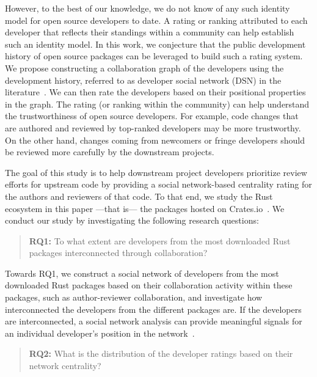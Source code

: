 \documentclass[10pt,journal,compsoc]{IEEEtran}
\begin{document}
However, to the best of our knowledge, we do not know of any such identity model for open source developers to date. A rating or ranking attributed to each developer that reflects their standings within a community can help establish such an identity model. In this work, we conjecture that the public development history of open source packages can be leveraged to build such a rating system. We propose constructing a collaboration graph of the developers using the development history, referred to as developer social network (DSN) in the literature~\cite{herbold2021systematic}. We can then rate the developers based on their positional properties in the graph. The rating (or ranking within the community) can help understand the trustworthiness of open source developers. For example, code changes that are authored and reviewed by top-ranked developers may be more trustworthy. On the other hand, changes coming from newcomers or fringe developers should be reviewed more carefully by the downstream projects. 

The goal of this study is to help downstream project developers prioritize review efforts for upstream code by providing a social network-based centrality rating for the authors and reviewers of that code. To that end, we study the Rust ecosystem in this paper —that is— the packages hosted on Crates.io~\cite{cratesio}. We conduct our study by investigating the following research questions:

\begin{quote}
    \textbf{RQ1:} To what extent are developers from the most downloaded Rust packages interconnected through collaboration? 
\end{quote}

Towards RQ1, we construct a social network of developers from the most downloaded Rust packages based on their collaboration activity within these packages, such as author-reviewer collaboration, and investigate how interconnected the developers from the different packages are. If the developers are interconnected, a social network analysis can provide meaningful signals for an individual developer's position in the network~\cite{sherchan2013survey}.

\begin{quote}
   \textbf{RQ2:} 
   What is the distribution of the developer ratings based on their network centrality?
\end{quote}
\end{document}
